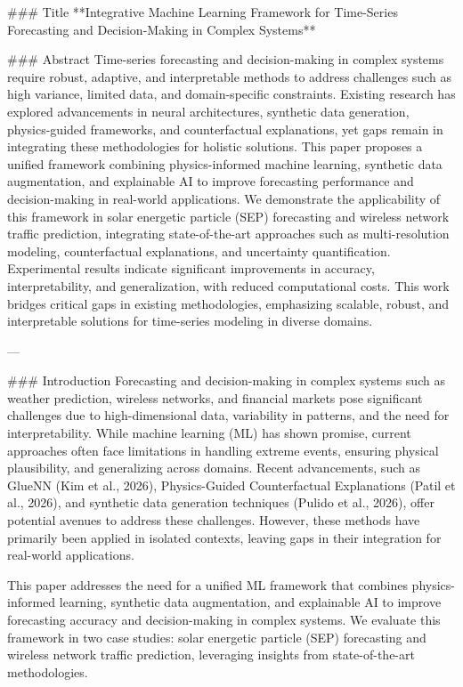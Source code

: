 ### Title  
**Integrative Machine Learning Framework for Time-Series Forecasting and Decision-Making in Complex Systems**

### Abstract  
Time-series forecasting and decision-making in complex systems require robust, adaptive, and interpretable methods to address challenges such as high variance, limited data, and domain-specific constraints. Existing research has explored advancements in neural architectures, synthetic data generation, physics-guided frameworks, and counterfactual explanations, yet gaps remain in integrating these methodologies for holistic solutions. This paper proposes a unified framework combining physics-informed machine learning, synthetic data augmentation, and explainable AI to improve forecasting performance and decision-making in real-world applications. We demonstrate the applicability of this framework in solar energetic particle (SEP) forecasting and wireless network traffic prediction, integrating state-of-the-art approaches such as multi-resolution modeling, counterfactual explanations, and uncertainty quantification. Experimental results indicate significant improvements in accuracy, interpretability, and generalization, with reduced computational costs. This work bridges critical gaps in existing methodologies, emphasizing scalable, robust, and interpretable solutions for time-series modeling in diverse domains.

---

### Introduction  
Forecasting and decision-making in complex systems such as weather prediction, wireless networks, and financial markets pose significant challenges due to high-dimensional data, variability in patterns, and the need for interpretability. While machine learning (ML) has shown promise, current approaches often face limitations in handling extreme events, ensuring physical plausibility, and generalizing across domains. Recent advancements, such as GlueNN (Kim et al., 2026), Physics-Guided Counterfactual Explanations (Patil et al., 2026), and synthetic data generation techniques (Pulido et al., 2026), offer potential avenues to address these challenges. However, these methods have primarily been applied in isolated contexts, leaving gaps in their integration for real-world applications.

This paper addresses the need for a unified ML framework that combines physics-informed learning, synthetic data augmentation, and explainable AI to improve forecasting accuracy and decision-making in complex systems. We evaluate this framework in two case studies: solar energetic particle (SEP) forecasting and wireless network traffic prediction, leveraging insights from state-of-the-art methodologies.

